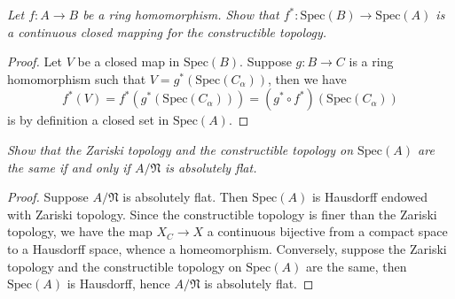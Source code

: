 \begin{problem}\em
Let $f:A\to B$ be a ring homomorphism. Show that $f^*:\mathrm{Spec}(B)\to\mathrm{Spec}(A)$ is a continuous closed mapping for the constructible topology.
\end{problem}
\begin{proof}
Let $V$ be a closed map in $\mathrm{Spec}(B)$. Suppose $g:B\to C$ is a ring homomorphism such that $V=g^*(\mathrm{Spec}(C_\alpha))$, then we have 
$$
f^*\left( V \right) =f^*\left( g^*\left( \mathrm{Spec}\left( C_{\alpha} \right) \right) \right) =\left( g^*\circ f^* \right) \left( \mathrm{Spec}\left( C_{\alpha} \right) \right) 
$$
is by definition a closed set in $\mathrm{Spec}(A)$.
\end{proof}
\begin{problem}\em
Show that the Zariski topology and the constructible topology on $\mathrm{Spec}(A)$ are the same if and only if $A/\mathfrak{N}$ is absolutely flat.
\end{problem}
\begin{proof}
Suppose $A/\mathfrak{N}$ is absolutely flat. Then $\mathrm{Spec}(A)$ is Hausdorff endowed with Zariski topology. Since the constructible topology is finer than the Zariski topology, we have the map $X_C\to X$ a continuous bijective from a compact space to a Hausdorff space, whence a homeomorphism. Conversely, suppose the Zariski topology and the constructible topology on $\mathrm{Spec}(A)$ are the same, then $\mathrm{Spec}(A)$ is Hausdorff, hence $A/\mathfrak{N}$ is absolutely flat.
\end{proof}